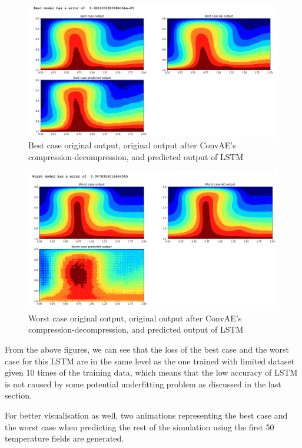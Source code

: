 \begin{figure}[H]
    \caption{Best case original output, original output after ConvAE's compression-decompression, and predicted output of LSTM}
    \includegraphics[scale=0.5]{Report LaTeX/figures/mantle_convection_images/larger_dataset/LSTM_Best.png}
\end{figure}

\begin{figure}[H]
    \caption{Worst case original output, original output after ConvAE's compression-decompression, and predicted output of LSTM}
    \includegraphics[scale=0.5]{Report LaTeX/figures/mantle_convection_images/larger_dataset/LSTM_Worst.png}
\end{figure}


From the above figures, we can see that the loss of the best case and the worst case for this LSTM are in the same level as the one trained with limited dataset given 10 times of the training data, which means that the low accuracy of LSTM is not caused by some potential underfitting problem as discussed in the last section.

For better visualisation as well, two animations representing the best case and the worst case when predicting the rest of the simulation using the first 50 temperature fields are generated.

